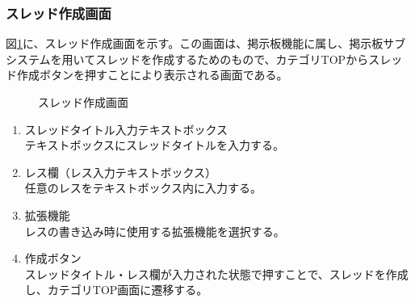 \documentclass[a4j]{jarticle}
\begin{document}
\subsubsection{スレッド作成画面}
図\ref{fig:make_thread}に、スレッド作成画面を示す。この画面は、掲示板機能に属し、掲示板サブシステムを用いてスレッドを作成するためのもので、カテゴリTOPからスレッド作成ボタンを押すことにより表示される画面である。\\
\begin{figure}[H]
\centering
{}
\caption{スレッド作成画面}
\label{fig:make_thread}
\end{figure}

\begin{enumerate}
  \renewcommand{\labelenumi}{\textcircled{\scriptsize \theenumi}}

\item スレッドタイトル入力テキストボックス\\
テキストボックスにスレッドタイトルを入力する。

\item レス欄（レス入力テキストボックス）\\
任意のレスをテキストボックス内に入力する。

\item 拡張機能\\
レスの書き込み時に使用する拡張機能を選択する。

\item 作成ボタン\\
スレッドタイトル・レス欄が入力された状態で押すことで、スレッドを作成し、カテゴリTOP画面に遷移する。
\end{enumerate}
\end{document}

